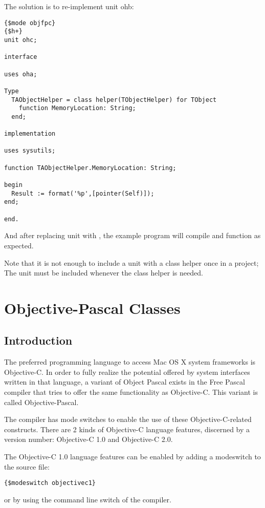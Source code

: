 The solution is to re-implement unit ohb:
\begin{verbatim}
{$mode objfpc}
{$h+}
unit ohc;

interface

uses oha;

Type
  TAObjectHelper = class helper(TObjectHelper) for TObject
    function MemoryLocation: String;
  end;
  
implementation

uses sysutils;
   
function TAObjectHelper.MemoryLocation: String;

begin
  Result := format('%p',[pointer(Self)]);
end;

end.     
\end{verbatim}
And after replacing unit  with , the example program will
compile and function as expected.

Note that it is not enough to include a unit with a class helper once in a
project; The unit must be included whenever the class helper is needed. 


\chapter{Objective-Pascal Classes}
\label{ch:ObjectivePascal}


\section{Introduction}
The preferred programming language to access Mac OS X system frameworks is
Objective-C. In order to fully realize the potential offered by system
interfaces written in that language, a variant of Object Pascal 
exists in the Free Pascal compiler that tries to offer the same
functionality as Objective-C. This variant is called Objective-Pascal. 

The compiler has mode switches to enable the use of these Objective-C-related
constructs. There are 2 kinds of Objective-C language features, discerned by
a version number: Objective-C 1.0 and Objective-C 2.0. 

The Objective-C 1.0 language features can be enabled by adding a modeswitch
to the source file:
\begin{verbatim}
{$modeswitch objectivec1}
\end{verbatim}
or by using the  command line switch of the compiler. 


